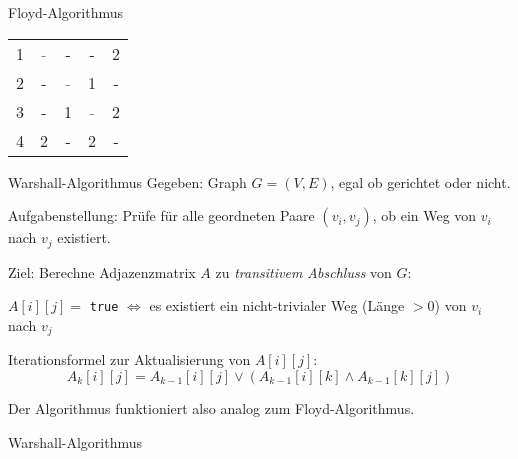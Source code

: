 \begin{example}{Floyd-Algorithmus}
\begin{center}
\begin{tabular}[t]{|c|cccc|}
            \hline
            1 & \textcolor{gray}{-} & -                   & -                   & 2 \\
            2 & -                   & \textcolor{gray}{-} & 1                   & - \\
            3 & -                   & 1                   & \textcolor{gray}{-} & 2 \\
            4 & 2                   & -                   & 2                   & - \\
            \hline
        \end{tabular}
    \end{center}
\end{example}

\begin{algo}{Warshall-Algorithmus}
    Gegeben: Graph $G = (V, E)$, egal ob gerichtet oder nicht.

    Aufgabenstellung: Prüfe für alle geordneten Paare $(v_i, v_j)$, ob ein Weg von $v_i$ nach $v_j$ existiert.

    Ziel: Berechne Adjazenzmatrix $A$ zu \emph{transitivem Abschluss} von $G$:
    \begin{center}
        $A[i][j] = $ \texttt{true} $\iff$ es existiert ein nicht-trivialer Weg (Länge $>0$) von $v_i$ nach $v_j$
    \end{center}

    Iterationsformel zur Aktualisierung von $A[i][j]$:
    $$
        A_k[i][j] = A_{k-1}[i][j] \lor (A_{k-1}[i][k] \land A_{k-1}[k][j])
    $$

    Der Algorithmus funktioniert also analog zum Floyd-Algorithmus.
\end{algo}

\begin{code}{Warshall-Algorithmus}
    
\end{code}